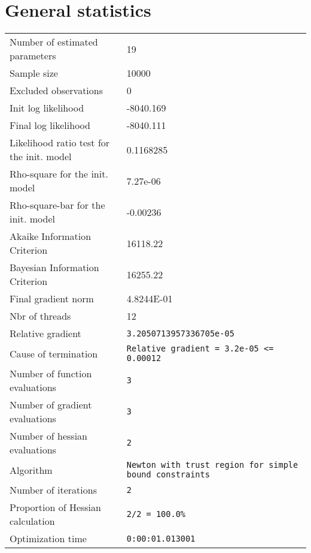 



\section{General statistics}
\begin{tabular}{ll}
Number of estimated parameters & 19 \\
Sample size & 10000 \\
Excluded observations & 0 \\
Init log likelihood & -8040.169 \\
Final log likelihood & -8040.111 \\
Likelihood ratio test for the init. model & 0.1168285 \\
Rho-square for the init. model & 7.27e-06 \\
Rho-square-bar for the init. model & -0.00236 \\
Akaike Information Criterion & 16118.22 \\
Bayesian Information Criterion & 16255.22 \\
Final gradient norm & 4.8244E-01 \\
Nbr of threads & 12 \\
Relative gradient & \verb$3.2050713957336705e-05$ \\
Cause of termination & \verb$Relative gradient = 3.2e-05 <= 0.00012$ \\
Number of function evaluations & \verb$3$ \\
Number of gradient evaluations & \verb$3$ \\
Number of hessian evaluations & \verb$2$ \\
Algorithm & \verb$Newton with trust region for simple bound constraints$ \\
Number of iterations & \verb$2$ \\
Proportion of Hessian calculation & \verb$2/2 = 100.0%$ \\
Optimization time & \verb$0:00:01.013001$ \\
\end{tabular}

